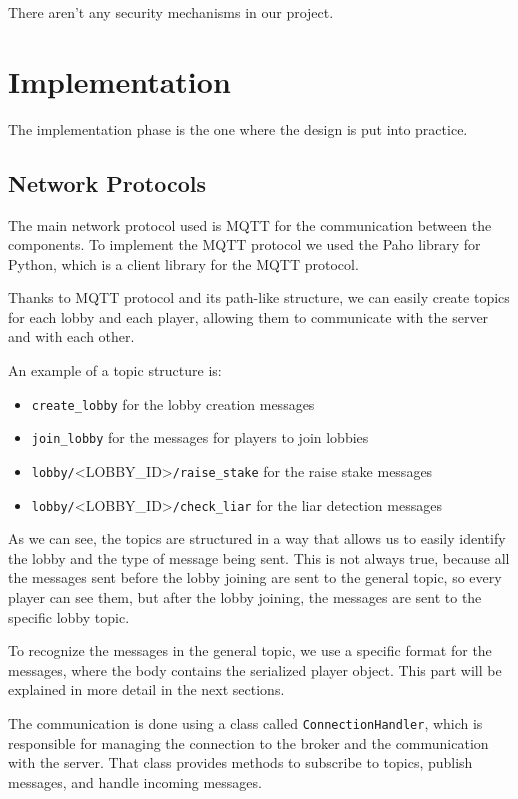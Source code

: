 \documentclass{scrartcl}
\begin{document}
There aren't any security mechanisms in our project.

\newpage
\section{Implementation}\label{implementation}
The implementation phase is the one where the design is put into practice.

\subsection{Network Protocols}\label{network-protocols}
The main network protocol used is MQTT for the communication between the components.
To implement the MQTT protocol we used the Paho library for Python, which is a client library for 
the MQTT protocol.

Thanks to MQTT protocol and its path-like structure, we can easily create topics for each lobby 
and each player, allowing them to communicate with the server and with each other.

An example of a topic structure is:
\begin{itemize}
      \item \texttt{create\_lobby} for the lobby creation messages
      \item \texttt{join\_lobby} for the messages for players to join lobbies
      \item \texttt{lobby/}\textless LOBBY\_ID\textgreater\texttt{/raise\_stake} for the raise stake messages
      \item \texttt{lobby/}\textless LOBBY\_ID\textgreater\texttt{/check\_liar} for the liar detection messages
\end{itemize}

As we can see, the topics are structured in a way that allows us to easily identify the lobby and the 
type of message being sent. This is not always true, because all the messages sent before the lobby 
joining are sent to the general topic, so every player can see them, but after the lobby joining, the 
messages are sent to the specific lobby topic.

To recognize the messages in the general topic, we use a specific format for the messages, where the 
body contains the serialized player object. This part will be explained in more detail in the next 
sections.

The communication is done using a class called \texttt{ConnectionHandler}, which is responsible for 
managing the connection to the broker and the communication with the server. That class provides 
methods to subscribe to topics, publish messages, and handle incoming messages.
\end{document}
